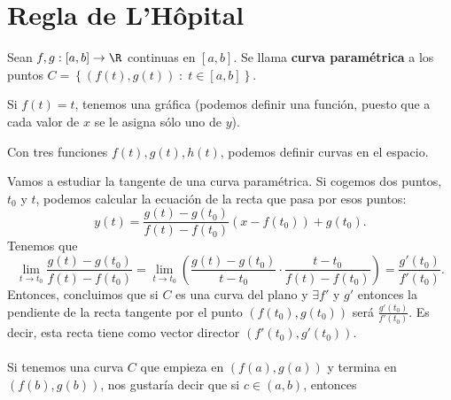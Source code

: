 \section{Regla de L'Hôpital}
\begin{fdefinition}
	\normalfont Sean $\displaystyle f,g : \left[a,b\right]  \to \R $ continuas en $\displaystyle \left[a,b\right]  $. Se llama \textbf{curva paramétrica} a los puntos $\displaystyle C = \left\{ \left(f\left(t\right), g\left(t\right)\right) \; : \; t \in \left[a,b\right] \right\}  $.
\end{fdefinition}
\begin{observation}
\normalfont Si $\displaystyle f\left(t\right) = t $, tenemos una gráfica (podemos definir una función, puesto que a cada valor de $\displaystyle x $ se le asigna sólo uno de $\displaystyle y $).
\end{observation}
\begin{observation}
\normalfont Con tres funciones $\displaystyle f\left(t\right),g\left(t\right),h\left(t\right) $, podemos definir curvas en el espacio.
\end{observation}
Vamos a estudiar la tangente de una curva paramétrica. Si cogemos dos puntos, $\displaystyle t_{0} $ y $\displaystyle t $, podemos calcular la ecuación de la recta que pasa por esos puntos:
\[y\left(t\right) =  \frac{g\left(t\right)-g\left(t_{0}\right)}{f\left(t\right)-f\left(t_{0}\right)}\left(x-f(t_{0})\right) + g\left(t_{0}\right)   .\]
Tenemos que 
\[\lim_{t \to t_{0}}\frac{g\left(t\right)-g\left(t_{0}\right)}{f\left(t\right)-f\left(t_{0}\right)}= \lim_{t \to t_{0}} \left(\frac{g\left(t\right)-g\left(t_{0}\right)}{t-t_{0}} \cdot \frac{t - t_{0}}{f\left(t\right)-f\left(t_{0}\right)}\right) = \frac{g'\left(t_{0}\right)}{f'\left(t_{0}\right)} .\]
Entonces, concluimos que si $\displaystyle C $ es una curva del plano y $\displaystyle \exists f' $ y $\displaystyle g' $ entonces la pendiente de la recta tangente por el punto $\displaystyle \left(f\left(t_{0}\right), g\left(t_{0}\right)\right) $ será $\displaystyle \frac{g'\left(t_{0}\right)}{f'\left(t_{0}\right)} $. Es decir, esta recta tiene como vector director $\displaystyle \left(f'\left(t_{0}\right), g'\left(t_{0}\right)\right) $. \\ \\ 
Si tenemos una curva $\displaystyle C $ que empieza en $\displaystyle \left(f\left(a\right), g\left(a\right)\right) $ y termina en $\displaystyle \left(f\left(b\right), g\left(b\right)\right) $, nos gustaría decir que si $\displaystyle c \in \left(a,b\right) $, entonces
